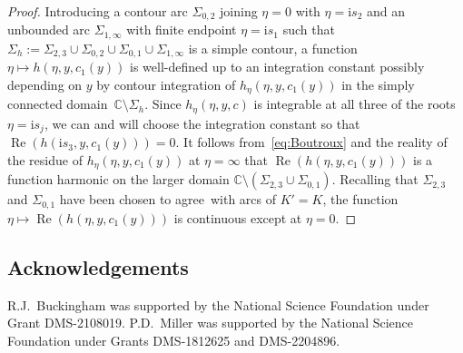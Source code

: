 \documentclass[pdftex]{sigma}
\numberwithin{equation}{section}
\begin{document}
\begin{proof}
Introducing a contour arc $\Sigma_{0,2}$ joining $\eta=0$ with $\eta=\mathrm{i} s_2$ and an unbounded arc $\Sigma_{1,\infty}$ with finite endpoint $\eta=\mathrm{i} s_1$ such that $\Sigma_h:=\Sigma_{2,3}\cup\Sigma_{0,2}\cup\Sigma_{0,1}\cup\Sigma_{1,\infty}$ is a simple contour, a function $\eta\mapsto h(\eta,y,c_1(y))$ is well-defined up to an integration constant possibly depending on $y$ by contour integration of $h_\eta(\eta,y,c_1(y))$ in the simply connected domain~${\mathbb{C}\setminus\Sigma_h}$. Since $h_\eta(\eta,y,c)$ is integrable at all three of the roots $\eta=\mathrm{i} s_j$, we can and will choose the integration constant so that $\operatorname{Re}(h(\mathrm{i} s_3,y,c_1(y)))=0$. It follows from~\eqref{eq:Boutroux} and the reality of the residue of $h_\eta(\eta,y,c_1(y))$ at $\eta=\infty$ that $\operatorname{Re}(h(\eta,y,c_1(y)))$ is a function harmonic on the larger domain $\mathbb{C}\setminus(\Sigma_{2,3}\cup\Sigma_{0,1})$. Recalling that $\Sigma_{2,3}$ and $\Sigma_{0,1}$ have been chosen to agree~with arcs of $K'=K$, the function $\eta\mapsto\operatorname{Re}(h(\eta,y,c_1(y)))$ is continuous except at ${\eta=0}$.
\end{proof}

\subsection*{Acknowledgements}

R.J.~Buckingham was supported by the National Science Foundation under Grant
DMS-2108019. P.D.~Miller was supported by the National Science Foundation under
Grants DMS-1812625 and DMS-2204896.
\end{document}
